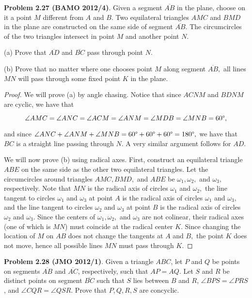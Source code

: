 \documentclass[letterpaper,oneside]{book}
\begin{document}
  \textbf{Problem 2.27 (BAMO 2012/4)}.   Given a segment $\overline{AB}$ in the plane, choose on it a point $M$ different from $A$ and $B$. Two equilateral triangles $AMC$ and $BMD$ in the plane are constructed on the same side of segment $\overline{AB}.$ The circumcircles of the two triangles intersect in point $M$ and another point $N.$

(a) Prove that $\overline{AD}$ and $\overline{BC}$ pass through point $N.$

(b) Prove that no matter where one chooses point $M$ along segment $\overline{AB},$ all lines $MN$ will pass through some fixed point $K$ in the plane.

  \begin{proof}  We will prove (a) by angle chasing. Notice that since $ACNM$ and $BDNM$ are cyclic, we have that

$$\angle AMC = \angle ANC = \angle ACM = \angle ANM = \angle MDB = \angle MNB = 60\degree,$$

and since $\angle ANC + \angle ANM + \angle MNB = 60\degree + 60\degree + 60\degree = 180\degree,$ we have that $BC$ is a straight line passing through $N.$ A very similar argument follows for $AD.$

We will now prove (b) using radical axes. First, construct an equilateral triangle $ABE$ on the same side as the other two equilateral triangles. Let the circumcircles around triangles $AMC, BMD,$ and $ABE$ be $\omega_1, \omega_2,$ and $\omega_3,$ respectively. Note that $MN$ is the radical axis of circles $\omega_1$ and $\omega_2,$ the line tangent to circles $\omega_1$ and $\omega_3$ at point $A$ is the radical axis of circles $\omega_1$ and $\omega_3,$ and the line tangent to circles $\omega_2$ and $\omega_3$ at point $B$ is the radical axis of circles $\omega_2$ and $\omega_3.$ Since the centers of  $\omega_1, \omega_2,$ and $\omega_3$ are not colinear, their radical axes (one of which is $MN$) must coincide at the radical center $K.$ Since changing the location of $M$ on $AB$ does not change the tangents at $A$ and $B,$ the point $K$ does not move, hence all possible lines $MN$ must pass through $K.$ \end{proof}

  

  \textbf{Problem 2.28 (JMO 2012/1)}.   Given a triangle $ABC$, let $P$ and $Q$ be points on segments $\overline{AB}$ and $\overline{AC}$, respectively, such that $AP = AQ.$ Let $S$ and $R$ be distinct points on segment $\overline{BC}$ such that $S$ lies between $B$ and $R$, $\angle BPS = \angle PRS$, and $\angle CQR = \angle QSR$. Prove that $P, Q, R, S$ are concyclic.
\end{document}
